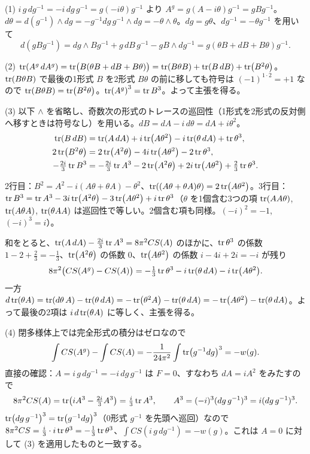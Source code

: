 \begin{solution}
(1) $i\,g\,dg^{-1}=-i\,dg\,g^{-1}=g(-i\theta)g^{-1}$ より $A^g=g(A-i\theta)g^{-1}=gBg^{-1}$。$d\theta=d(g^{-1})\wedge dg=-g^{-1}dg\,g^{-1}\wedge dg=-\theta\wedge\theta$。$dg=g\theta$、$dg^{-1}=-\theta g^{-1}$ を用いて
\[
d(gBg^{-1})=dg\wedge Bg^{-1}+g\,dB\,g^{-1}-gB\wedge dg^{-1}=g(\theta B+dB+B\theta)g^{-1}.
\]

(2) $\tr(A^g\,dA^g)=\tr\bigl(B(\theta B+dB+B\theta)\bigr)=\tr(B\theta B)+\tr(B\,dB)+\tr(B^2\theta)$。$\tr(B\theta B)$ で最後の1形式 $B$ を2形式 $B\theta$ の前に移しても符号は $(-1)^{1\cdot2}=+1$ なので $\tr(B\theta B)=\tr(B^2\theta)$。$\tr(A^g)^3=\tr B^3$。よって主張を得る。

(3) 以下 $\wedge$ を省略し、奇数次の形式のトレースの巡回性（1形式を2形式の反対側へ移すときは符号なし）を用いる。$dB=dA-i\,d\theta=dA+i\theta^2$。
\begin{align*}
\tr(B\,dB)&=\tr(A\,dA)+i\tr(A\theta^2)-i\tr(\theta\,dA)+\tr\theta^3,\\
2\tr(B^2\theta)&=2\tr(A^2\theta)-4i\tr(A\theta^2)-2\tr\theta^3,\\
-\tfrac{2i}{3}\tr B^3&=-\tfrac{2i}{3}\tr A^3-2\tr(A^2\theta)+2i\tr(A\theta^2)+\tfrac23\tr\theta^3 .
\end{align*}
\begin{note}
2行目：$B^2=A^2-i(A\theta+\theta A)-\theta^2$、$\tr((A\theta+\theta A)\theta)=2\tr(A\theta^2)$。3行目：$\tr B^3=\tr A^3-3i\tr(A^2\theta)-3\tr(A\theta^2)+i\tr\theta^3$（$\theta$ を1個含む3つの項 $\tr(AA\theta)$, $\tr(A\theta A)$, $\tr(\theta AA)$ は巡回性で等しい。2個含む項も同様。$(-i)^2=-1$, $(-i)^3=i$）。
\end{note}
和をとると、$\tr(A\,dA)-\frac{2i}3\tr A^3=8\pi^2CS(A)$ のほかに、$\tr\theta^3$ の係数 $1-2+\frac23=-\frac13$、$\tr(A^2\theta)$ の係数 $0$、$\tr(A\theta^2)$ の係数 $i-4i+2i=-i$ が残り
\[
8\pi^2\bigl(CS(A^g)-CS(A)\bigr)=-\tfrac13\tr\theta^3-i\tr(\theta\,dA)-i\tr(A\theta^2).
\]
一方 $d\tr(\theta A)=\tr(d\theta\,A)-\tr(\theta\,dA)=-\tr(\theta^2A)-\tr(\theta\,dA)=-\tr(A\theta^2)-\tr(\theta\,dA)$。よって最後の2項は $i\,d\tr(\theta A)$ に等しく、主張を得る。

(4) 閉多様体上では完全形式の積分はゼロなので
\[
\int CS(A^g)-\int CS(A)=-\frac{1}{24\pi^2}\int\tr(g^{-1}dg)^3=-w(g).
\]
直接の確認：$A=i\,g\,dg^{-1}=-i\,dg\,g^{-1}$ は $F=0$、すなわち $dA=iA^2$ をみたすので
\[
8\pi^2CS(A)=\tr\bigl(iA^3-\tfrac{2i}3A^3\bigr)=\tfrac i3\tr A^3,\qquad A^3=(-i)^3(dg\,g^{-1})^3=i(dg\,g^{-1})^3 .
\]
$\tr(dg\,g^{-1})^3=\tr(g^{-1}dg)^3$（0形式 $g^{-1}$ を先頭へ巡回）なので $8\pi^2CS=\frac i3\cdot i\tr\theta^3=-\frac13\tr\theta^3$、$\int CS(i\,g\,dg^{-1})=-w(g)$。これは $A=0$ に対して (3) を適用したものと一致する。
\end{solution}

